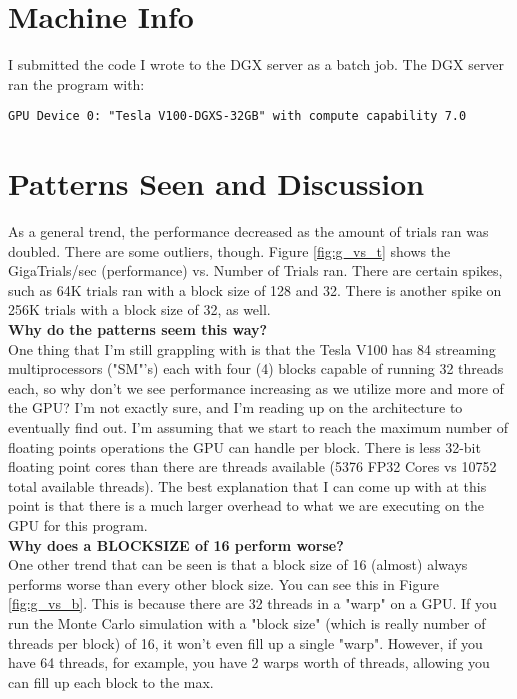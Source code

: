 \documentclass[12pt,letterpaper]{article}
\begin{document}
\section{Machine Info}

I submitted the code I wrote to the DGX server as a batch job. The DGX server ran the program with: \\

\begin{lstlisting}
GPU Device 0: "Tesla V100-DGXS-32GB" with compute capability 7.0
\end{lstlisting}

\section{Patterns Seen and Discussion}

As a general trend, the performance decreased as the amount of trials ran was doubled. There are some outliers, though. Figure \ref{fig:g_vs_t} shows the GigaTrials/sec (performance) vs. Number of Trials ran. There are certain spikes, such as 64K trials ran with a block size of 128 and 32. There is another spike on 256K trials with a block size of 32, as well. \\

\noindent \textbf{Why do the patterns seem this way?} \\
\noindent One thing that I'm still grappling with is that the Tesla V100 has 84 streaming multiprocessors ("SM"'s) each with four (4) blocks capable of running 32 threads each, so why don't we see performance increasing as we utilize more and more of the GPU? I'm not exactly sure, and I'm reading up on the architecture to eventually find out. I'm assuming that we start to reach the maximum number of floating points operations the GPU can handle per block. There is less 32-bit floating point cores than there are threads available (5376 FP32 Cores vs 10752 total available threads). The best explanation that I can come up with at this point is that there is a much larger overhead to what we are executing on the GPU for this program.\\

\noindent \textbf{Why does a BLOCKSIZE of 16 perform worse?} \\
\noindent One other trend that can be seen is that a block size of 16 (almost) always performs worse than every other block size. You can see this in Figure \ref{fig:g_vs_b}. This is because there are 32 threads in a "warp" on a GPU. If you run the Monte Carlo simulation with a "block size" (which is really number of threads per block) of 16, it won't even fill up a single "warp". However, if you have 64 threads, for example, you have 2 warps worth of threads, allowing you can fill up each block to the max. \\
\end{document}
